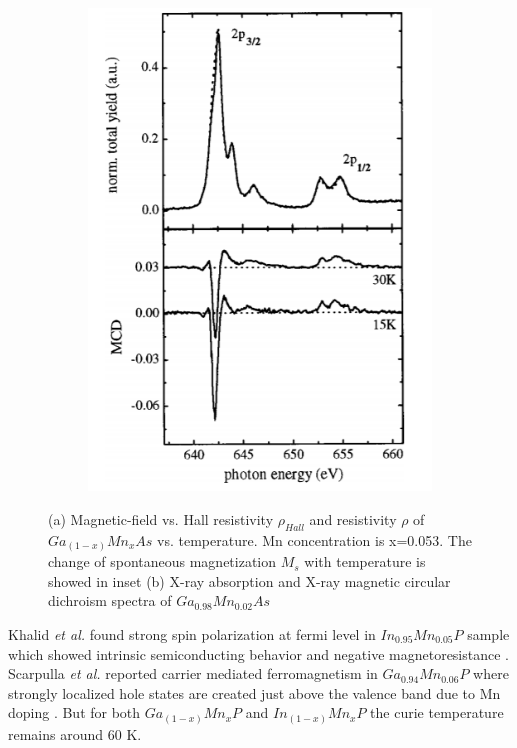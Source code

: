 \documentclass[main.tex]{subfiles}
\begin{document}
\begin{figure}[!htb]
\begin{subfigure}[h]{0.46\textwidth}
  		\includegraphics[width=\linewidth]{ohldag}
  		\caption{}
	\end{subfigure}
\caption{(a) Magnetic-field vs. Hall resistivity $\rho_{Hall}$ and resistivity $\rho$ of $Ga_{(1-x)}Mn_{x}As$ vs. temperature. Mn concentration is x=0.053. The change of spontaneous magnetization $M_{s}$ with temperature is showed in inset \cite{matsukura1998transport} (b) X-ray absorption and X-ray magnetic circular dichroism spectra of $Ga_{0.98}Mn_{0.02}As$ \cite{ohldag2000magnetic}} 
\label{fig:fig}

\end{figure}
\FloatBarrier

Khalid \textit{et al.} found strong spin polarization at fermi level in $In_{0.95}Mn_{0.05}P$ sample which showed intrinsic semiconducting behavior and negative magnetoresistance \cite{khalid2014ferromagnetism}. Scarpulla \textit{et al.} reported carrier mediated ferromagnetism in $Ga_{0.94}Mn_{0.06}P$ where strongly localized hole states are created just above the valence band due to Mn doping \cite{scarpulla2005ferromagnetism}. But for both $Ga_{(1-x)}Mn_{x}P$ and $In_{(1-x)}Mn_{x}P$ the curie temperature remains around 60 K. 
\end{document}
